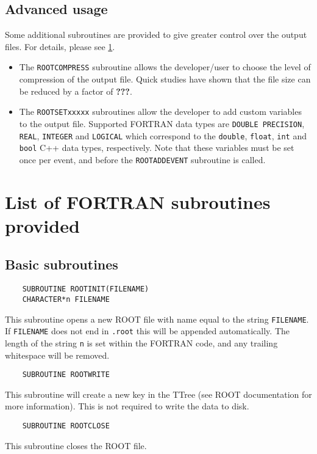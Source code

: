 \documentclass[a4paper,12pt]{article}
\begin{document}
\subsection{Advanced usage}
Some additional subroutines are provided to give greater control over the output files. For details, please see \textsection\ref{sec:routines}.
\begin{itemize}
    \item The \verb|ROOTCOMPRESS| subroutine allows the developer/user to choose the level of compression of the output file. Quick studies have shown that the file size can be reduced by a factor of \textbf{???}.
    \item The \verb|ROOTSETxxxxx| subroutines allow the developer to add custom variables to the output file. Supported FORTRAN data types are \verb|DOUBLE PRECISION|, \verb|REAL|, \verb|INTEGER| and \verb|LOGICAL| which correspond to the \verb|double|, \verb|float|, \verb|int| and \verb|bool| C++ data types, respectively. Note that these variables must be set once per event, and before the \verb|ROOTADDEVENT| subroutine is called.
\end{itemize}

\section{List of FORTRAN subroutines provided}
\label{sec:routines}
\subsection{Basic subroutines}
\begin{verbatim}
    SUBROUTINE ROOTINIT(FILENAME)
    CHARACTER*n FILENAME\end{verbatim}
This subroutine opens a new ROOT file with name equal to the string \verb|FILENAME|. If \verb|FILENAME| does not end in \verb|.root| this will be appended automatically. The length of the string \verb|n| is set within the FORTRAN code, and any trailing whitespace will be removed.

\begin{verbatim}
    SUBROUTINE ROOTWRITE\end{verbatim}
This subroutine will create a new key in the TTree (see ROOT documentation for more information). This is not required to write the data to disk.

\begin{verbatim}
    SUBROUTINE ROOTCLOSE\end{verbatim}
This subroutine closes the ROOT file.
\end{document}
